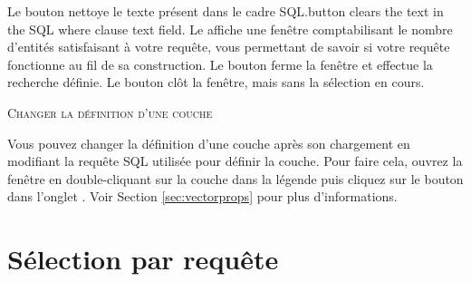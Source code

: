 Le bouton  nettoye le texte présent dans le cadre SQL.button clears the text in the SQL where clause text field. Le  affiche une fenêtre comptabilisant le nombre d'entités satisfaisant à votre requête, vous permettant de savoir si votre requête fonctionne au fil de sa construction. Le bouton  ferme la fenêtre et effectue la recherche définie. Le bouton  clôt la fenêtre, mais sans la sélection en cours.

\begin{Tip}\caption{\textsc{Changer la définition d'une couche}}
Vous pouvez changer la définition d'une couche après son chargement en modifiant la requête SQL utilisée pour définir la couche. Pour faire cela, ouvrez la fenêtre  en double-cliquant sur la couche dans la légende puis cliquez sur le bouton  dans l'onglet . Voir Section \ref{sec:vectorprops} pour plus d'informations.
\end{Tip}

\section{Sélection par requête}\label{sec:select_by_query}

